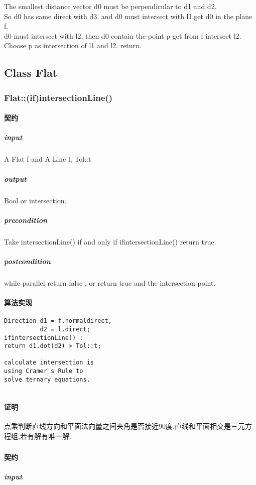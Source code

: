 \documentclass[a4paper]{book}
\numberwithin{equation}{chapter}
\theoremstyle{definition}
\begin{document}
\begin{multicols}{2}
The smallest distance vector d0 must be perpendicular to d1 and d2. \\

So d0 has same direct with d3.
and d0 must intersect with l1,get d0 in the plane f. \\

d0 must intersect with l2, then d0 contain the point p get from f intersect l2. \\

Choose p as intersection of l1 and l2. return.


\subsection{Class Flat}

\subsubsection{Flat::(if)intersectionLine()}
\paragraph{契约}
\subparagraph{input}
A Flat f and A Line l, Tol::t
\subparagraph{output}
Bool or intersection.
\subparagraph{precondition}
Take intersectionLine() if and only if ifintersectionLine() return true.
\subparagraph{postcondition}
while parallel return false , or return true and the intersection point.
\paragraph{算法实现}
\begin{lstlisting}
Direction d1 = f.normaldirect,
          d2 = l.direct;
ifintersectionLine() : 
return d1.dot(d2) > Tol::t;

calculate intersection is 
using Cramer's Rule to 
solve ternary equations.


\end{lstlisting}
\paragraph{证明}
点乘判断直线方向和平面法向量之间夹角是否接近90度.直线和平面相交是三元方程组,若有解有唯一解.


\subsubsection{}
\paragraph{契约}
\subparagraph{input}


\end{multicols}
\end{document}
